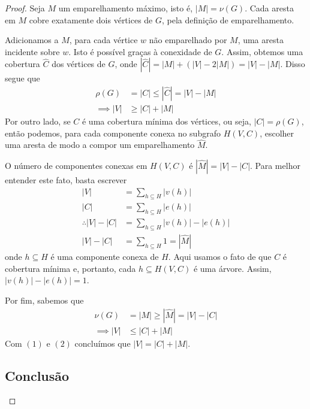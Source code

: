 \documentclass{homework}
\begin{document}
	\begin{proof}
		Seja $M$ um emparelhamento máximo, isto é, $|M| = \nu(G)$. Cada aresta em $M$ cobre exatamente dois vértices de $G$, pela definição de emparelhamento. 
		\begin{fig}
			
		\end{fig}
		Adicionamos a $M$, para cada vértice $w$ não emparelhado por $M$, uma aresta incidente sobre $w$. Isto é possível graças à conexidade de $G$. Assim, obtemos uma cobertura $\hat{C}$ dos vértices de $G$, onde $|\hat{C}| = |M| + (|V| - 2|M|) = |V| - |M|$. Disso segue que
		\begin{align}
		\rho(G) &= |C| \le |\hat{C}| = |V| - |M|\nonumber\\
		\implies |V| &\ge |C| + |M|
		\end{align}
		Por outro lado, se $C$ é uma cobertura mínima dos vértices, ou seja, $|C| = \rho(G)$, então podemos, para cada componente conexa no subgrafo $H(V, C)$, escolher uma aresta de modo a compor um emparelhamento $\hat{M}$.
		\begin{fig}
		 	
		\end{fig}
		O número de componentes conexas em $H(V, C)$ é $|\hat{M}| = |V| - |C|$. Para melhor entender este fato, basta escrever \begin{align*}
		|V| &= \sum_{h \subseteq H} |v(h)|\\
		|C| &= \sum_{h \subseteq H} |e(h)|\\
		\therefore |V| - |C| &= \sum_{h \subseteq H} |v(h)| - |e(h)|\\
		|V| - |C| &= \sum_{h \subseteq H} 1 = |\hat{M}|
		\end{align*}
		onde $h \subseteq H$ é uma componente conexa de $H$. Aqui usamos o fato de que $C$ é cobertura mínima e, portanto, cada $h \subseteq H(V, C)$ é uma árvore. Assim, $|v(h)| - |e(h)| = 1$.\par
		
		Por fim, sabemos que
		\begin{align}
		\nu(G) &= |M| \ge |\hat{M}| = |V| - |C|\nonumber\\
		\implies |V| &\le |C| + |M|
		\end{align}
		Com $(1)$ e $(2)$ concluímos que $|V| = |C| + |M|$.
		
		\subsection*{Conclusão}
		
	 	
	\end{proof}
	
\end{document}
